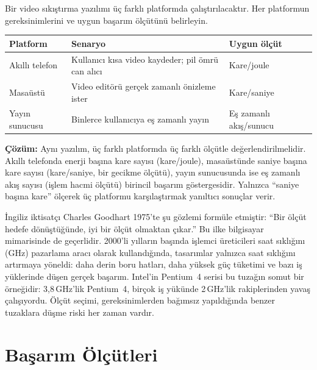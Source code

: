 \begin{ornek}[2.1]
Bir video sıkıştırma yazılımı üç farklı platformda çalıştırılacaktır. Her platformun gereksinimlerini ve uygun başarım ölçütünü belirleyin.

\begin{center}
\small
\begin{tabular}{lp{4.5cm}l}
\toprule
\textbf{Platform} & \textbf{Senaryo} & \textbf{Uygun ölçüt} \\
\midrule
Akıllı telefon & Kullanıcı kısa video kaydeder; pil ömrü can alıcı & Kare/joule \\
Masaüstü & Video editörü gerçek zamanlı önizleme ister & Kare/saniye \\
Yayın sunucusu & Binlerce kullanıcıya eş zamanlı yayın & Eş zamanlı akış/sunucu \\
\bottomrule
\end{tabular}
\end{center}

\textbf{Çözüm:} Aynı yazılım, üç farklı platformda üç farklı ölçütle değerlendirilmelidir. Akıllı telefonda enerji başına kare sayısı (kare/joule), masaüstünde saniye başına kare sayısı (kare/saniye, bir gecikme ölçütü), yayın sunucusunda ise eş zamanlı akış sayısı (işlem hacmi ölçütü) birincil başarım göstergesidir. Yalnızca ``saniye başına kare'' ölçerek üç platformu karşılaştırmak yanıltıcı sonuçlar verir.
\end{ornek}


\begin{bilginot}
İngiliz iktisatçı Charles Goodhart 1975'te şu gözlemi formüle etmiştir: ``Bir ölçüt hedefe dönüştüğünde, iyi bir ölçüt olmaktan çıkar.'' Bu ilke bilgisayar mimarisinde de geçerlidir. 2000'li yılların başında işlemci üreticileri saat sıklığını (GHz) pazarlama aracı olarak kullandığında, tasarımlar yalnızca saat sıklığını artırmaya yöneldi: daha derin boru hatları, daha yüksek güç tüketimi ve bazı iş yüklerinde düşen gerçek başarım. Intel'in Pentium~4 serisi bu tuzağın somut bir örneğidir: 3,8\,GHz'lik Pentium~4, birçok iş yükünde 2\,GHz'lik rakiplerinden yavaş çalışıyordu. Ölçüt seçimi, gereksinimlerden bağımsız yapıldığında benzer tuzaklara düşme riski her zaman vardır.
\end{bilginot}


\section{Başarım Ölçütleri}
\label{sec:basarim-olcut}

